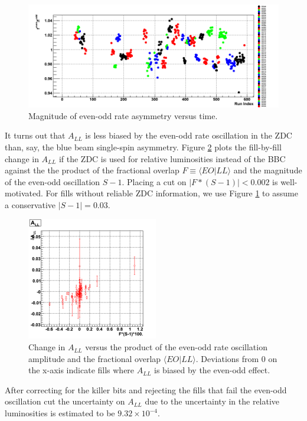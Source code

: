 \begin{figure}
  \includegraphics[width=1.0\textwidth]{figures/fevfod}
  \caption{Magnitude of even-odd rate asymmetry versus time.}
  \label{fig:fevfod}
\end{figure}

It turns out that $A_{LL}$ is less biased by the even-odd rate oscillation in
the ZDC than, say, the blue beam single-spin asymmetry. Figure \ref{fig:cll}
plots the fill-by-fill change in $A_{LL}$ if the ZDC is used for relative
luminosities instead of the BBC against the the product of the fractional
overlap $F \equiv \langle EO | LL \rangle$ and the magnitude of the even-odd
oscillation $S-1$. Placing a cut on $|F*(S-1)| < 0.002$ is well-motivated. For
fills without reliable ZDC information, we use Figure \ref{fig:fevfod} to
assume a conservative $|S-1| = 0.03$.

\begin{figure}
  \begin{center}
  \includegraphics[]{figures/cll}
  \end{center}
  \caption{Change in $A_{LL}$ versus the product of the even-odd rate oscillation amplitude and the fractional overlap $\langle EO | LL \rangle$.  Deviations from 0 on the x-axis indicate fills where $A_{LL}$ is biased by the even-odd effect.}
  \label{fig:cll}
\end{figure}

After correcting for the killer bits and rejecting the fills that fail the
even-odd oscillation cut the uncertainty on $A_{LL}$ due to the uncertainty in
the relative luminosities is estimated to be $9.32\times10^{-4}$.

